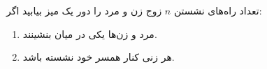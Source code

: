\p
تعداد راه‌های نشستن $n$ 
زوج زن و مرد را دور یک میز بیابید اگر:
\begin{enumerate}
  \item 
    مرد و زن‌ها یکی در میان بنشینند.

  \item 
    هر زنی کنار همسر خود نشسته باشد.
\end{enumerate}